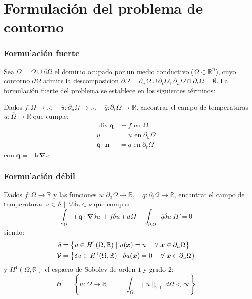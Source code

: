 \documentclass{beamer}
\newcommand{\norm}[1]{\lVert #1 \rVert}
\begin{document}
\section{Formulación del problema de contorno}
\begin{frame}
\frametitle{Formulación fuerte}

Sea $\overline{\Omega}=\Omega \cup \partial \Omega$ el dominio ocupado
por un medio conductivo ($\overline{\Omega} \subset \mathbb{R}^n$), cuyo
contorno $\partial \Omega$ admite la descomposición
$\partial \Omega=\partial_u \Omega \cup \partial_t \Omega$,
$\partial_u \Omega \cap \partial_t \Omega= \emptyset$. La formulación fuerte
del problema se establece en los siguientes términos:

Dados $f:\Omega \rightarrow \mathbb{R},\quad
\overline{u} :\partial_u \Omega \rightarrow \mathbb{R}, \quad
\overline{q} :\partial_t \Omega \rightarrow \mathbb{R}$, encontrar el
campo de temperaturas $u:\overline{\Omega}\rightarrow \mathbb{R}$ que
cumple:
\begin{align}
\operatorname{div} \bm{q}&=f \textrm{ en } \Omega\\
u&=\overline{u} \textrm{ en } \partial_u \Omega \\
\bm{q}\cdot \bm{n} &=\overline{q} \textrm{ en } \partial_t \Omega
\end{align}
con $\bm{q}=-\bm{k} \bm{\nabla} u$
\end{frame}
\begin{frame}
\frametitle{Formulación débil}

Dados $f:\Omega \rightarrow \mathbb{R}$ y las funciones
$\overline{u} :\partial_u \Omega \rightarrow \mathbb{R}, \quad
\overline{q} :\partial_t \Omega \rightarrow \mathbb{R}$, encontrar el
campo de temperaturas $u \in \delta \, \mid \, \forall \delta u \in
\nu$ que cumple:
\begin{equation}
\int_{\Omega} 
\left( \bm{q} \cdot \bm{\nabla} \delta u \, + f \delta u \right) \,
d \Omega - \int_{\partial_t \Omega} \overline{q} \delta u \, d \Gamma=0
\end{equation}
siendo:
\begin{align}
\delta&=\left\{
u \in H^1(\Omega,\mathbb{R}) \mid u(\bm{x})=\overline{u}
\; \quad \forall \; \bm{x} \in \partial_u \Omega \right\} \label{trial} \\
{\cal V}&=\left\{
\delta u \in H^1(\Omega,\mathbb{R}) \mid \delta u(\bm{x})=0
\; \quad \forall \; \bm{x} \in \partial_u \Omega \right\} \label{weight}
\end{align}
y $H^1(\Omega,\mathbb{R})$ el espacio de Sobolev de orden $1$ y grado $2$:
$$
H^1=\left\{ u:\Omega \rightarrow \mathbb{R} \quad \mid \quad
\int_{\Omega} \norm{u}_{2,1} \, d\Omega <\infty \right\}
$$
\end{frame}
\end{document}

